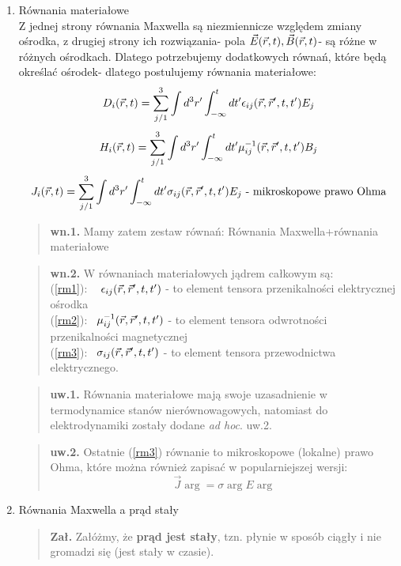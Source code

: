 \begin{enumerate}
\item{Równania materiałowe} \\
Z jednej strony równania Maxwella są niezmiennicze względem zmiany ośrodka, z drugiej strony ich rozwiązania- pola $\vec{E}(\vec{r},t),\vec{B}(\vec{r},t)$- są różne w różnych ośrodkach. Dlatego potrzebujemy dodatkowych równań, które będą określać ośrodek- dlatego postulujemy równania materiałowe:
\begin{equation} {D}_i(\vec{r},t)=\sum_{j/1}^3\int d^3r'\int_{-\infty}^t dt' \epsilon_{ij}(\vec{r},\vec{r}',t,t') E_j \label{rm1}\end{equation}
\begin{equation} H_i (\vec{r},t) =\sum_{j/1}^3\int d^3r'\int_{-\infty}^t dt' \mu^{-1}_{ij}(\vec{r},\vec{r}',t,t') B_j \label{rm2}\end{equation}
\begin{equation} J_i (\vec{r},t) =\sum_{j/1}^3\int d^3r'\int_{-\infty}^t dt' \sigma_{ij}(\vec{r},\vec{r}',t,t') E_j \label{rm3}  \text{ - mikroskopowe prawo Ohma}\end{equation}
\begin{verse}\textbf{wn.1.} Mamy zatem zestaw równań: Równania Maxwella+równania materiałowe \end{verse}
\begin{verse}\textbf{wn.2.} W równaniach materiałowych jądrem całkowym są:\\
(\ref{rm1}): ~ $\epsilon_{ij}(\vec{r},\vec{r}',t,t')$ - to element tensora przenikalności elektrycznej ośrodka\\
(\ref{rm2}):  ~$\mu^{-1}_{ij}(\vec{r},\vec{r}',t,t')$ - to element tensora odwrotności przenikalności magnetycznej\\
(\ref{rm3}):  ~$\sigma_{ij}(\vec{r},\vec{r}',t,t')$  - to element tensora przewodnictwa elektrycznego. \end{verse}
\begin{verse} \textbf{uw.1.} Równania materiałowe mają swoje uzasadnienie w termodynamice stanów nierównowagowych, natomiast do elektrodynamiki zostały dodane \textsl{ad hoc}.
uw.2. \end{verse}
\begin{verse} \textbf{uw.2.} Ostatnie (\ref{rm3}) równanie to mikroskopowe (lokalne) prawo Ohma, które można również zapisać w popularniejszej wersji:
\begin{equation} \vec{J} \arg =\sigma\arg E\arg \end{equation} \end{verse}

\item{Równania Maxwella a prąd stały}\\
\begin{verse} \textbf{Zał.} Załóżmy, że \textbf{prąd jest stały}, tzn. płynie w sposób ciągły i nie gromadzi się (jest stały w czasie). \end{verse}


\end{enumerate}
